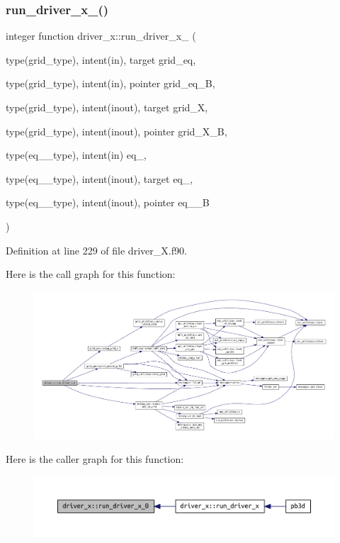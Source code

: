 \subsubsection{\texorpdfstring{run\+\_\+driver\+\_\+x\+\_()}{run\_driver\_x\_0()}}
{\footnotesize\ttfamily integer function driver\+\_\+x\+::run\+\_\+driver\+\_\+x\+\_ (\begin{DoxyParamCaption}\item[{type(grid\+\_\+type), intent(in), target}]{grid\+\_\+eq,  }\item[{type(grid\+\_\+type), intent(in), pointer}]{grid\+\_\+eq\+\_\+B,  }\item[{type(grid\+\_\+type), intent(inout), target}]{grid\+\_\+X,  }\item[{type(grid\+\_\+type), intent(inout), pointer}]{grid\+\_\+\+X\+\_\+B,  }\item[{type(eq\+\_\+1\+\_\+type), intent(in)}]{eq\+\_,  }\item[{type(eq\+\_\+2\+\_\+type), intent(inout), target}]{eq\+\_,  }\item[{type(eq\+\_\+2\+\_\+type), intent(inout), pointer}]{eq\+\_\+\_\+B }\end{DoxyParamCaption})}



Definition at line 229 of file driver\+\_\+\+X.\+f90.

Here is the call graph for this function\+:
\nopagebreak
\begin{figure}[H]
\begin{center}
\leavevmode
\includegraphics[width=350pt]{namespacedriver__x_a2b82a9bc6c0f4af9f3468d03fedc008e_cgraph}
\end{center}
\end{figure}
Here is the caller graph for this function\+:
\nopagebreak
\begin{figure}[H]
\begin{center}
\leavevmode
\includegraphics[width=350pt]{namespacedriver__x_a2b82a9bc6c0f4af9f3468d03fedc008e_icgraph}
\end{center}
\end{figure}
\mbox{\label{namespacedriver__x_a454779cefa6da3714d32eedcec0ef7de}} 
